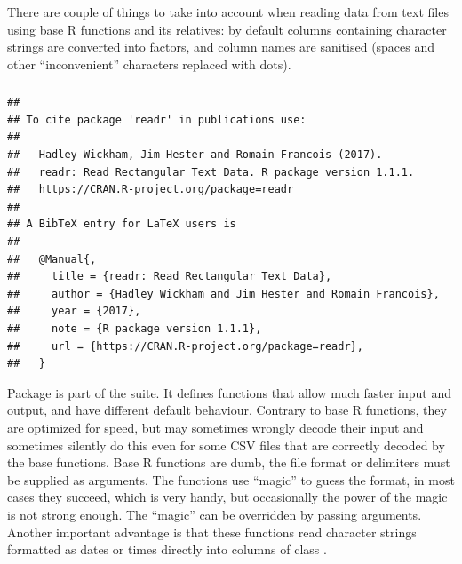 \documentclass[krantz2,ChapterTOCs]{krantz}\usepackage{knitr}
\begin{document}
\begin{warningbox}
There are couple of things to take into account when reading data from text files using base R functions  and its relatives: by default columns containing character strings are converted into factors, and column names are sanitised (spaces and other ``inconvenient'' characters replaced with dots).
\end{warningbox}

\subsubsection[readr]{}\label{sec:files:readr}

\begin{knitrout}\footnotesize
{}\color{fgcolor}\begin{kframe}
\begin{alltt}
\hlstd{(} \hlstd{=} \hlstd{)}
\end{alltt}
\begin{verbatim}
## 
## To cite package 'readr' in publications use:
## 
##   Hadley Wickham, Jim Hester and Romain Francois (2017).
##   readr: Read Rectangular Text Data. R package version 1.1.1.
##   https://CRAN.R-project.org/package=readr
## 
## A BibTeX entry for LaTeX users is
## 
##   @Manual{,
##     title = {readr: Read Rectangular Text Data},
##     author = {Hadley Wickham and Jim Hester and Romain Francois},
##     year = {2017},
##     note = {R package version 1.1.1},
##     url = {https://CRAN.R-project.org/package=readr},
##   }
\end{verbatim}
\end{kframe}
\end{knitrout}

Package  is part of the  suite. It defines functions that allow much faster input and output, and have different default behaviour. Contrary to base R functions, they are optimized for speed, but may sometimes wrongly decode their input and sometimes silently do this even for some CSV files that are correctly decoded by the base functions. Base R functions are dumb, the file format or delimiters must be supplied as arguments. The  functions use ``magic'' to guess the format, in most cases they succeed, which is very handy, but occasionally the power of the magic is not strong enough. The ``magic'' can be overridden by passing arguments. Another important advantage is that these functions read character strings formatted as dates or times directly into columns of class .
\end{document}
